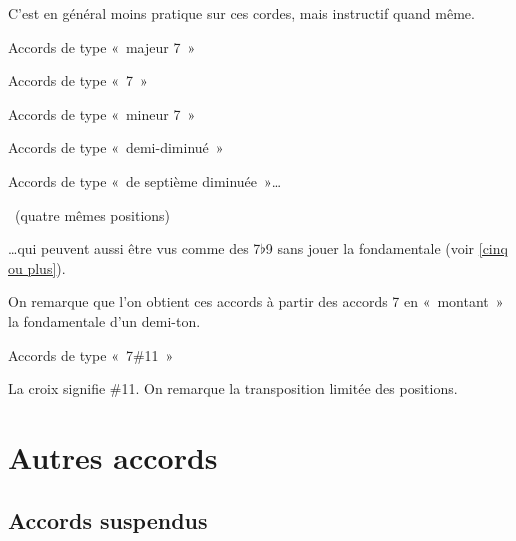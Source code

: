 \documentclass[11pt]{article}
\begin{document}
C’est en général moins pratique sur ces cordes, mais instructif quand même.


Accords de type «~majeur 7~»



Accords de type «~7~»


Accords de type «~mineur 7~»


Accords de type «~demi-diminué~»


Accords de type «~de septième diminuée~»…

~(quatre mêmes positions)

…qui peuvent aussi être vus comme des 7$\flat$9 sans jouer la fondamentale
(voir \ref{cinq ou plus}).


On remarque que l’on obtient ces accords à partir des accords 7 en
«~montant~» la fondamentale d’un demi-ton.

Accords de type «~7\#11~»


La croix signifie \#11. On remarque la transposition limitée des positions.

\section{Autres accords}

\subsection{Accords suspendus}
\end{document}
